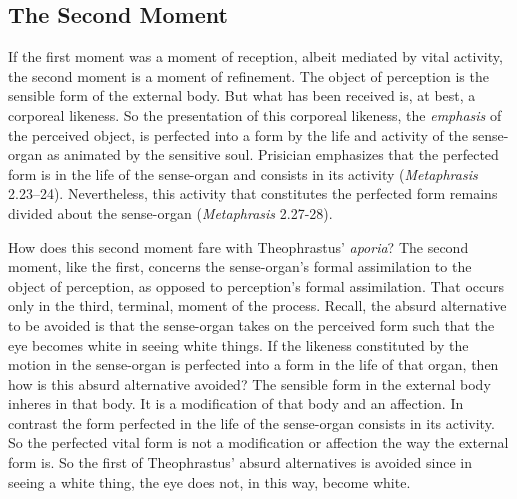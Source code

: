 \documentclass[12pt]{article}
\begin{document}

\subsection{The Second Moment} %
\label{sub:the_second_moment}

If the first moment was a moment of reception, albeit mediated by vital activity, the second moment is a moment of refinement. The object of perception is the sensible form of the external body. But what has been received is, at best, a corporeal likeness. So the presentation of this corporeal likeness, the \emph{emphasis} of the perceived object, is perfected into a form by the life and activity of the sense-organ as animated by the sensitive soul. Prisician emphasizes that the perfected form is in the life of the sense-organ and consists in its activity (\emph{Metaphrasis} 2.23--24). Nevertheless, this activity that constitutes the perfected form remains divided about the sense-organ (\emph{Metaphrasis} 2.27-28).

How does this second moment fare with Theophrastus' \emph{aporia}? The second moment, like the first, concerns the sense-organ's formal assimilation to the object of perception, as opposed to perception's formal assimilation. That occurs only in the third, terminal, moment of the process. Recall, the absurd alternative to be avoided is that the sense-organ takes on the perceived form such that the eye becomes white in seeing white things. If the likeness constituted by the motion in the sense-organ is perfected into a form in the life of that organ, then how is this absurd alternative avoided? The sensible form in the external body inheres in that body. It is a modification of that body and an affection. In contrast the form perfected in the life of the sense-organ consists in its activity. So the perfected vital form is not a modification or affection the way the external form is. So the first of Theophrastus' absurd alternatives is avoided since in seeing a white thing, the eye does not, in this way, become white.
\end{document}
